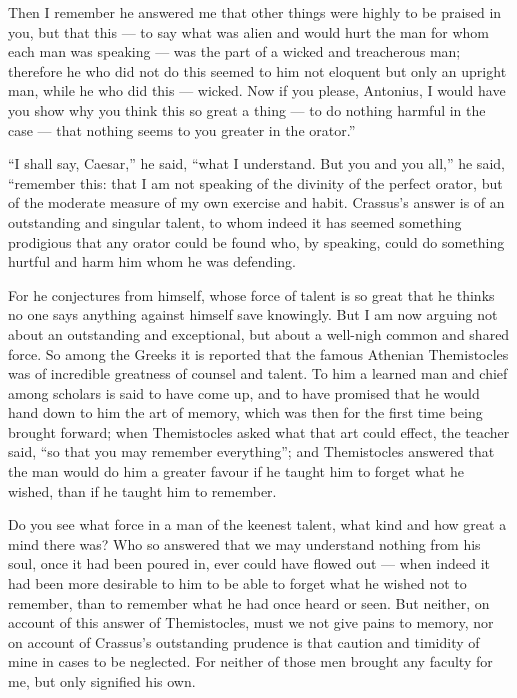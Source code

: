  Then I remember he answered me that other things were highly to be praised in you, but that this — to say what was alien and would hurt the man for whom each man was speaking — was the part of a wicked and treacherous man; therefore he who did not do this seemed to him not eloquent but only an upright man, while he who did this — wicked. Now if you please, Antonius, I would have you show why you think this so great a thing — to do nothing harmful in the case — that nothing seems to you greater in the orator.''

 ``I shall say, Caesar,'' he said, ``what I understand. But you and you all,'' he said, ``remember this: that I am not speaking of the divinity of the perfect orator, but of the moderate measure of my own exercise and habit. Crassus's answer is of an outstanding and singular talent, to whom indeed it has seemed something prodigious that any orator could be found who, by speaking, could do something hurtful and harm him whom he was defending.

 For he conjectures from himself, whose force of talent is so great that he thinks no one says anything against himself save knowingly. But I am now arguing not about an outstanding and exceptional, but about a well-nigh common and shared force. So among the Greeks it is reported that the famous Athenian Themistocles was of incredible greatness of counsel and talent. To him a learned man and chief among scholars is said to have come up, and to have promised that he would hand down to him the art of memory, which was then for the first time being brought forward; when Themistocles asked what that art could effect, the teacher said, ``so that you may remember everything''; and Themistocles answered that the man would do him a greater favour if he taught him to forget what he wished, than if he taught him to remember.

 Do you see what force in a man of the keenest talent, what kind and how great a mind there was? Who so answered that we may understand nothing from his soul, once it had been poured in, ever could have flowed out — when indeed it had been more desirable to him to be able to forget what he wished not to remember, than to remember what he had once heard or seen. But neither, on account of this answer of Themistocles, must we not give pains to memory, nor on account of Crassus's outstanding prudence is that caution and timidity of mine in cases to be neglected. For neither of those men brought any faculty for me, but only signified his own.

